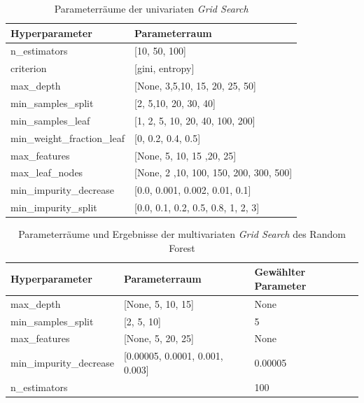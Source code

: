 \begin{table}[H]
	\centering
	\begin{tabular}{ll}
		\hline
		Hyperparameter              & Parameterraum                              \\ \hline
		n\_estimators               & {[}10, 50, 100{]}                          \\
		criterion                   & {[}gini, entropy{]}                    \\
		max\_depth                  & {[}None, 3,5,10, 15, 20, 25, 50{]}         \\
		min\_samples\_split         & {[}2, 5,10, 20, 30, 40{]}                  \\
		min\_samples\_leaf          & {[}1, 2, 5, 10, 20, 40, 100, 200{]}                  \\
		min\_weight\_fraction\_leaf & {[}0, 0.2, 0.4, 0.5{]}                     \\
		max\_features               & {[}None, 5, 10, 15 ,20, 25{]}              \\
		max\_leaf\_nodes            & {[}None, 2 ,10, 100, 150, 200, 300, 500{]} \\
		min\_impurity\_decrease     & {[}0.0, 0.001, 0.002, 0.01, 0.1{]}     \\
		min\_impurity\_split        & {[}0.0, 0.1, 0.2, 0.5, 0.8, 1, 2, 3{]}     \\ \hline
	\end{tabular}
	\caption{Parameterräume der univariaten \emph{Grid Search}}
	\label{table:parameter_grid_univariat}
\end{table}

\begin{table}[H]
	\centering
	\begin{tabular}{lll}
		\hline
		Hyperparameter          & Parameterraum                       & Gewählter Parameter \\ \hline
		max\_depth              & {[}None, 5, 10, 15{]}               & None                \\
		min\_samples\_split     & {[}2, 5, 10{]}                      & 5                   \\
		max\_features           & {[}None, 5, 20, 25{]}               & None                \\
		min\_impurity\_decrease & {[}0.00005, 0.0001, 0.001, 0.003{]} & 0.00005             \\ 
		n\_estimators &  & 100 \\ \hline
	\end{tabular}
	\caption{\label{table:parameter_grid_multivariat_forest} Parameterräume und Ergebnisse der multivariaten \emph{Grid Search} des Random Forest}
\end{table}


